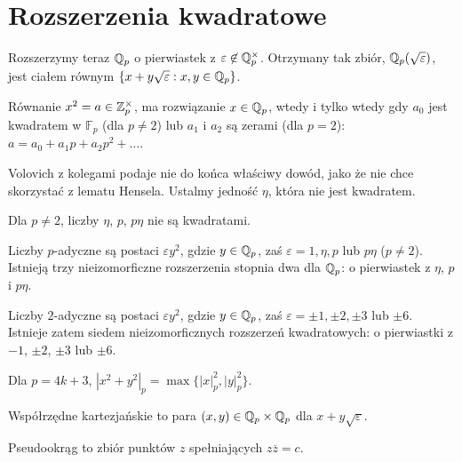 \section{Rozszerzenia kwadratowe}
Rozszerzymy  teraz $\mathbb Q_p$ o pierwiastek z $\varepsilon \not \in \mathbb Q_p^\times$. Otrzymany tak zbiór, $\mathbb Q_p(\sqrt{\varepsilon})$, jest ciałem równym $\{x + y \sqrt{\varepsilon} : x, y \in \mathbb Q_p\}$.

\begin{lemat}
	Równanie $x^2 = a \in \mathbb Z_p^\times$, ma rozwiązanie $x \in \mathbb Q_p$, wtedy i tylko wtedy gdy $a_0$ jest kwadratem w $\mathbb F_p$ (dla $p \neq 2$) lub $a_ 1$ i $a_2$ są zerami (dla $p = 2$): $a = a_0 + a_1p + a_2p^2 + \ldots$.
\end{lemat}

Volovich z kolegami podaje nie do końca właściwy dowód, jako że nie chce skorzystać z lematu Hensela.
Ustalmy  jedność $\eta$, która nie jest kwadratem.

\begin{wniosek}
	Dla $p \neq 2$, liczby $\eta$, $p$, $p \eta$ nie są kwadratami.
\end{wniosek}

\begin{wniosek}
	Liczby $p$-adyczne są postaci $\varepsilon y^2$, gdzie $y \in \mathbb Q_p$, zaś $\varepsilon = 1, \eta, p$ lub $p\eta$ ($p \neq 2$).
	Istnieją trzy nieizomorficzne rozszerzenia stopnia dwa dla $\mathbb Q_p$: o pierwiastek z $\eta$, $p$ i $p \eta$.
\end{wniosek}

\begin{wniosek}
	Liczby $2$-adyczne są postaci $\varepsilon y^2$, gdzie $y \in \mathbb Q_p$, zaś $\varepsilon = \pm 1, \pm 2, \pm 3$ lub $\pm 6$.
	Istnieje zatem siedem nieizomorficznych rozszerzeń kwadratowych: o pierwiastki z $-1$, $\pm 2$, $\pm 3$ lub $\pm 6$.
\end{wniosek}

\begin{wniosek}
	Dla $p = 4k + 3$, $|x^2 + y^2|_p = \max \{|x|^2_p, |y|_p^2\}$.
\end{wniosek}

\begin{definicja}
	Współrzędne kartezjańskie to para $(x, y) \in \mathbb Q_p \times \mathbb Q_p$ dla $x + y \sqrt{\varepsilon}$.
\end{definicja}

\begin{definicja}
	Pseudookrąg to zbiór punktów $z$ spełniających $z \overline z = c$.
\end{definicja}

